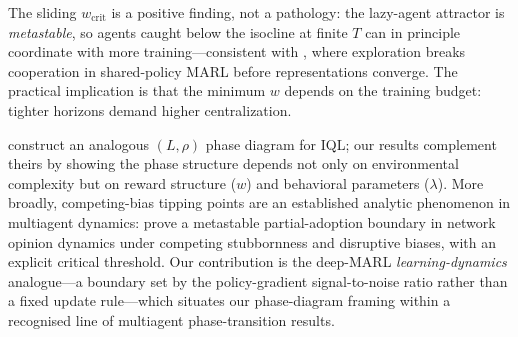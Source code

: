 \documentclass[letterpaper]{article}
\theoremstyle{plain}
\newcommand{\wcrit}{w_{\mathrm{crit}}}
\begin{document}
The sliding $\wcrit$ is a positive finding, not a pathology: the lazy-agent
attractor is \emph{metastable}, so agents caught below the isocline at finite
$T$ can in principle coordinate with more training---consistent with
\citet{weng2026}, where exploration breaks cooperation in shared-policy MARL
before representations converge. The practical implication is that the minimum
$w$ depends on the training budget: tighter horizons demand higher
centralization.

\citet{yamaguchi2025} construct an analogous $(L,\rho)$ phase diagram for IQL;
our results complement theirs by showing the phase structure depends not only on
environmental complexity but on reward structure ($w$) and behavioral parameters
($\lambda$). More broadly, competing-bias tipping points are an established analytic
phenomenon in multiagent dynamics: \citet{capannoli2026phase} prove a metastable
partial-adoption boundary in network opinion dynamics under competing stubbornness
and disruptive biases, with an explicit critical threshold. Our contribution is
the deep-MARL \emph{learning-dynamics} analogue---a boundary set by the
policy-gradient signal-to-noise ratio rather than a fixed update rule---which
situates our phase-diagram framing within a recognised line of multiagent
phase-transition results.
\end{document}
